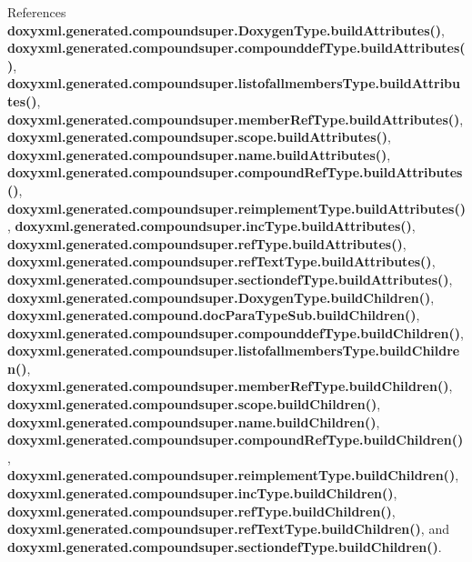 References {\bf doxyxml.\+generated.\+compoundsuper.\+Doxygen\+Type.\+build\+Attributes()}, {\bf doxyxml.\+generated.\+compoundsuper.\+compounddef\+Type.\+build\+Attributes()}, {\bf doxyxml.\+generated.\+compoundsuper.\+listofallmembers\+Type.\+build\+Attributes()}, {\bf doxyxml.\+generated.\+compoundsuper.\+member\+Ref\+Type.\+build\+Attributes()}, {\bf doxyxml.\+generated.\+compoundsuper.\+scope.\+build\+Attributes()}, {\bf doxyxml.\+generated.\+compoundsuper.\+name.\+build\+Attributes()}, {\bf doxyxml.\+generated.\+compoundsuper.\+compound\+Ref\+Type.\+build\+Attributes()}, {\bf doxyxml.\+generated.\+compoundsuper.\+reimplement\+Type.\+build\+Attributes()}, {\bf doxyxml.\+generated.\+compoundsuper.\+inc\+Type.\+build\+Attributes()}, {\bf doxyxml.\+generated.\+compoundsuper.\+ref\+Type.\+build\+Attributes()}, {\bf doxyxml.\+generated.\+compoundsuper.\+ref\+Text\+Type.\+build\+Attributes()}, {\bf doxyxml.\+generated.\+compoundsuper.\+sectiondef\+Type.\+build\+Attributes()}, {\bf doxyxml.\+generated.\+compoundsuper.\+Doxygen\+Type.\+build\+Children()}, {\bf doxyxml.\+generated.\+compound.\+doc\+Para\+Type\+Sub.\+build\+Children()}, {\bf doxyxml.\+generated.\+compoundsuper.\+compounddef\+Type.\+build\+Children()}, {\bf doxyxml.\+generated.\+compoundsuper.\+listofallmembers\+Type.\+build\+Children()}, {\bf doxyxml.\+generated.\+compoundsuper.\+member\+Ref\+Type.\+build\+Children()}, {\bf doxyxml.\+generated.\+compoundsuper.\+scope.\+build\+Children()}, {\bf doxyxml.\+generated.\+compoundsuper.\+name.\+build\+Children()}, {\bf doxyxml.\+generated.\+compoundsuper.\+compound\+Ref\+Type.\+build\+Children()}, {\bf doxyxml.\+generated.\+compoundsuper.\+reimplement\+Type.\+build\+Children()}, {\bf doxyxml.\+generated.\+compoundsuper.\+inc\+Type.\+build\+Children()}, {\bf doxyxml.\+generated.\+compoundsuper.\+ref\+Type.\+build\+Children()}, {\bf doxyxml.\+generated.\+compoundsuper.\+ref\+Text\+Type.\+build\+Children()}, and {\bf doxyxml.\+generated.\+compoundsuper.\+sectiondef\+Type.\+build\+Children()}.



